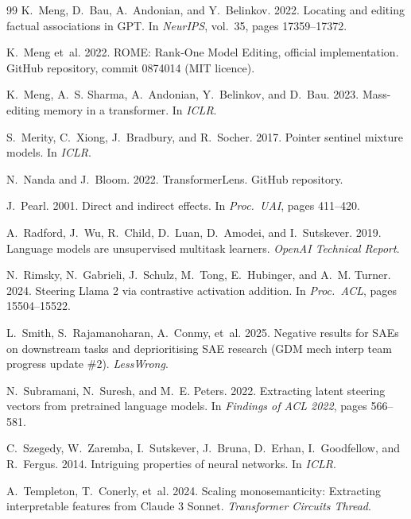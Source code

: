 \documentclass[11pt,twocolumn]{article}
\begin{document}
\begin{thebibliography}{99}
 K.~Meng, D.~Bau, A.~Andonian, and Y.~Belinkov. 2022. Locating and editing factual associations in GPT. In \textit{NeurIPS}, vol.~35, pages 17359--17372.

 K.~Meng et~al. 2022. ROME: Rank-One Model Editing, official implementation. GitHub repository, commit 0874014 (MIT licence).

 K.~Meng, A.~S. Sharma, A.~Andonian, Y.~Belinkov, and D.~Bau. 2023. Mass-editing memory in a transformer. In \textit{ICLR}.

 S.~Merity, C.~Xiong, J.~Bradbury, and R.~Socher. 2017. Pointer sentinel mixture models. In \textit{ICLR}.

 N.~Nanda and J.~Bloom. 2022. TransformerLens. GitHub repository.

 J.~Pearl. 2001. Direct and indirect effects. In \textit{Proc.\ UAI}, pages 411--420.

 A.~Radford, J.~Wu, R.~Child, D.~Luan, D.~Amodei, and I.~Sutskever. 2019. Language models are unsupervised multitask learners. \textit{OpenAI Technical Report}.

 N.~Rimsky, N.~Gabrieli, J.~Schulz, M.~Tong, E.~Hubinger, and A.~M. Turner. 2024. Steering Llama 2 via contrastive activation addition. In \textit{Proc.\ ACL}, pages 15504--15522.

 L.~Smith, S.~Rajamanoharan, A.~Conmy, et~al. 2025. Negative results for SAEs on downstream tasks and deprioritising SAE research (GDM mech interp team progress update \#2). \textit{LessWrong}.

 N.~Subramani, N.~Suresh, and M.~E. Peters. 2022. Extracting latent steering vectors from pretrained language models. In \textit{Findings of ACL 2022}, pages 566--581.

 C.~Szegedy, W.~Zaremba, I.~Sutskever, J.~Bruna, D.~Erhan, I.~Goodfellow, and R.~Fergus. 2014. Intriguing properties of neural networks. In \textit{ICLR}.

 A.~Templeton, T.~Conerly, et~al. 2024. Scaling monosemanticity: Extracting interpretable features from Claude 3 Sonnet. \textit{Transformer Circuits Thread}.


\end{thebibliography}
\end{document}
